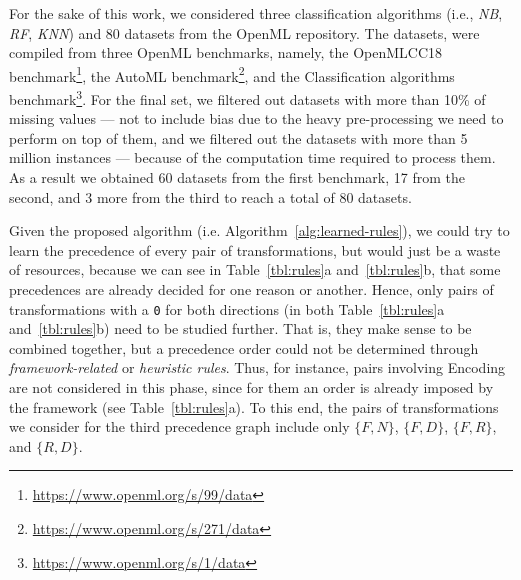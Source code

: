 \begin{example}
For the sake of this work, we considered three classification algorithms (i.e., \textit{NB}, \textit{RF},  \textit{KNN}) and 80 datasets from the OpenML repository. The datasets, were compiled from three OpenML benchmarks, namely, the OpenMLCC18 benchmark\footnote{\url{https://www.openml.org/s/99/data}}, the AutoML benchmark\footnote{\url{https://www.openml.org/s/271/data}}, and the Classification algorithms benchmark\footnote{\url{https://www.openml.org/s/1/data}}. For the final set, we filtered out datasets with more than 10\% of missing values --- not to include bias due to the heavy pre-processing we need to perform on top of them, and we filtered out the datasets with more than 5 million instances --- because of the computation time required to process them. As a result we obtained 60 datasets from the first benchmark, 17 from the second, and 3 more from the third to reach a total of 80 datasets. 

Given the proposed algorithm (i.e. Algorithm~\ref{alg:learned-rules}), we could try to learn the precedence of every pair of transformations, but would just be a waste of resources, because we can see in Table~\ref{tbl:rules}a and~\ref{tbl:rules}b, that some precedences are already decided for one reason or another. Hence, only pairs of transformations with a \texttt{0} for both directions (in both Table~\ref{tbl:rules}a and~\ref{tbl:rules}b) need to be studied further. That is, they make sense to be combined together, but a precedence order could not be determined through \textit{framework-related} or \textit{heuristic rules}. %
Thus, for instance, pairs involving Encoding are not considered in this phase, since for them an order is already imposed by the framework (see Table~\ref{tbl:rules}a).
To this end, the pairs of transformations we consider for the third precedence graph include only $\{F,N\}$, $\{F,D\}$, $\{F,R\}$, and $\{R,D\}$.


\end{example}
